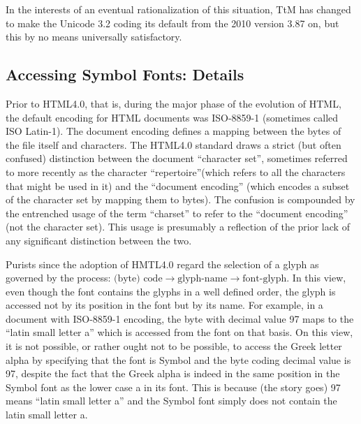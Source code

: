 \documentclass[12pt]{article}
\begin{document}
In the interests of an eventual rationalization of this situation, TtM
 has changed to make the Unicode 3.2 coding its default from the 2010
 version 3.87 on, but this by no means universally satisfactory.

\subsection{Accessing Symbol Fonts: Details}

Prior to HTML4.0, that is, during the major phase of the evolution of
HTML, the default encoding for HTML documents was ISO-8859-1
(sometimes called ISO Latin-1). The document encoding defines a
mapping between the bytes of the file itself and characters. The
HTML4.0 standard draws a strict (but often confused) distinction
between the document ``character set'', sometimes referred to more
recently as the character ``repertoire''(which refers to all the
characters that might be used in it) and the ``document encoding''
(which encodes a subset of the character set by mapping them to
bytes). The confusion is compounded by the entrenched usage of the term
``charset'' to refer to the ``document encoding'' (not the character
set). This usage is presumably a reflection of the prior lack of any
significant distinction between the two. 

Purists since the adoption of HMTL4.0 regard the selection of a glyph
as governed by the process: $\mbox{(byte) code} \rightarrow
\mbox{glyph-name} \rightarrow \mbox{font-glyph}$. In this view, even
though the font contains the glyphs in a well defined order, the
glyph is accessed not by its position in the font but by its name. For
example, in a document with ISO-8859-1 encoding, the byte with decimal
value 97 maps to the ``latin small letter a'' which is accessed from
the font on that basis.  On this view, it is not possible, or rather
ought not to be possible, to access the Greek letter alpha by
specifying that the font is Symbol and the byte coding decimal value
is 97, despite the fact that the Greek alpha is indeed in the same
position in the Symbol font as the lower case a in its font. This is
because (the story goes) 97 means ``latin small letter a'' and the
Symbol font simply does not contain the latin small letter a.
\end{document}

